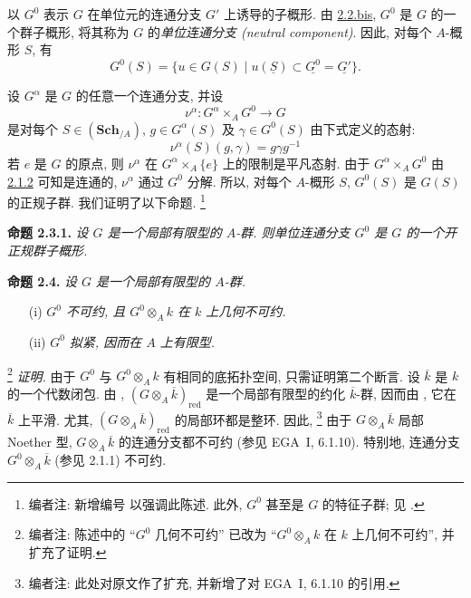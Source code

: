 以 \(G^0\) 表示 \(G\) 在单位元的连通分支 \(G'\) 上诱导的子概形.
由 \hyperref[par:sga3-VIA-2.2bis]{2.2.bis},
\(G^0\) 是 \(G\) 的一个群子概形,
将其称为 \(G\) 的\emph{单位连通分支 (neutral component)}.
因此, 对每个 \(A\)-概形 \(S\), 有
\[
  G^0(S)
    =\{u\in G(S)\mid
      u(\underline S)\subset\underline{G^0}=\underline{G'}\}.
\]

设 \(G^\alpha\) 是 \(G\) 的任意一个连通分支,
并设
\[
  \nu^\alpha:G^\alpha\times_AG^0\longrightarrow G
\]
是对每个 \(S\in(\mathbf{Sch}_{/A})\), \(g\in G^\alpha(S)\)
及 \(\gamma\in G^0(S)\) 由下式定义的态射:
\[
  \nu^\alpha(S)(g,\gamma)=g\gamma g^{-1}
\]
若 \(e\) 是 \(G\) 的原点,
则 \(\nu^\alpha\) 在 \(G^\alpha\times_A\{e\}\) 上的限制是平凡态射.
由于 \(G^\alpha\times_AG^0\) 由 \hyperref[lem:sga3-VIA-2.1.2]{2.1.2} 可知是连通的,
\(\nu^\alpha\) 通过 \(G^0\) 分解.
所以, 对每个 \(A\)-概形 \(S\),
\(G^0(S)\) 是 \(G(S)\) 的正规子群.
我们证明了以下命题.%
\footnote{\label{note:sga3-VIA-23}编者注:
新增编号  以强调此陈述.
此外, \(G^0\) 甚至是 \(G\) 的特征子群;
见 .}

\medskip
{}\label{prop:sga3-VIA-2.3.1}%
\noindent\textbf{命题 2.3.1.}
\textit{设 \(G\) 是一个局部有限型的 \(A\)-群.
则单位连通分支 \(G^0\) 是 \(G\) 的一个开正规群子概形.}

\medskip
{}\label{prop:sga3-VIA-2.4}%
\noindent\textbf{命题 2.4.}
\textit{设 \(G\) 是一个局部有限型的 \(A\)-群.}
\begin{enumerate}
\item[\SGAInlineRefTarget{prop:sga3-VIA-2.4:item:i}(i)]
\textit{\(G^0\) 不可约, 且 \(G^0\otimes_Ak\) 在 \(k\) 上几何不可约.}
\item[\SGAInlineRefTarget{prop:sga3-VIA-2.4:item:ii}(ii)]
\textit{\(G^0\) 拟紧, 因而在 \(A\) 上有限型.}
\end{enumerate}

\noindent\footnote{\label{note:sga3-VIA-24}编者注:
陈述中的 ``\(G^0\) 几何不可约'' 已改为
``\(G^0\otimes_Ak\) 在 \(k\) 上几何不可约'', 并扩充了证明.}
\textit{证明.}
由于 \(G^0\) 与 \(G^0\otimes_Ak\) 有相同的底拓扑空间,
只需证明第二个断言.
设 \(\overline k\) 是 \(k\) 的一个代数闭包.
由 ,
\((G\otimes_A\overline k)_{\mathrm{red}}\) 是一个局部有限型的约化
\(\overline k\)-群,
因而由 , 它在 \(\overline k\) 上平滑.
尤其, \((G\otimes_A\overline k)_{\mathrm{red}}\) 的局部环都是整环.
因此,%
\footnote{\label{note:sga3-VIA-25}编者注: 此处对原文作了扩充,
并新增了对 EGA~I, 6.1.10 的引用.}
由于 \(G\otimes_A\overline k\) 局部 Noether 型,
\(G\otimes_A\overline k\) 的连通分支都不可约
(参见 EGA~I, 6.1.10).
特别地, 连通分支 \(G^0\otimes_A\overline k\) (参见 2.1.1) 不可约.

